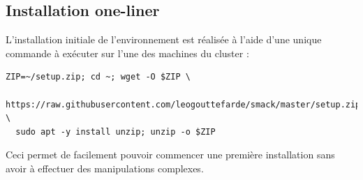 \documentclass[a4paper, 11pt, titlepage]{article}
\begin{document}
\subsection {Installation one-liner}

L'installation initiale de l'environnement est réalisée à l'aide d'une unique commande à exécuter sur l'une des machines du cluster :

\begin{verbatim}
ZIP=~/setup.zip; cd ~; wget -O $ZIP \
  https://raw.githubusercontent.com/leogouttefarde/smack/master/setup.zip; \
  sudo apt -y install unzip; unzip -o $ZIP
\end{verbatim}

Ceci permet de facilement pouvoir commencer une première installation sans avoir à effectuer des manipulations complexes.
\end{document}
